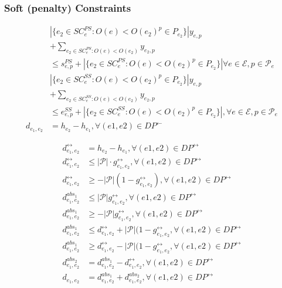 \documentclass{article}
\newcommand{\scriptP}{\mathcal{P}}
\newcommand{\scriptE}{\mathcal{E}}
\begin{document}
\subsubsection{Soft (penalty) Constraints}

\begin{align}
    &|\{e_2 \in SC_e^{PS}: O(e) < O(e_2) ^ p \in P_{e_2}\}| y_{e,p} \nonumber \\
    &+ \sum_{e_2 \in SC^{PS}_e : O(e) < O(e_2)} y_{e_2, p} \nonumber\\
    &\le s^{PS}_{e,p} + |\{e_2 \in SC_e^{PS}: O(e) < O(e_2) ^ p \in P_{e_2}\}| \forall e \in \scriptE, p \in \scriptP_e \\
    &|\{e_2 \in SC_e^{SS}: O(e) < O(e_2) ^ p \in P_{e_2}\}| y_{e,p} \nonumber\\ 
    &+ \sum_{e_2\in SC_e^{SS}:O(e)<O(e_2)} y_{e_2, p} \nonumber\\
    &\le e^{SS}_{e,p} + |\{e_2 \in SC_e^{SS}: O(e) < O(e_2) ^ p \in P_{e_2}\}|, \forall e \in \scriptE, p \in \scriptP_e \\
    d_{e_1, e_2} &= h_{e_2} - h_{e_1}, \forall (e1, e2) \in DP^{\leftarrow}
\end{align}

\begin{align}
    d^{\leftrightarrow}_{e_1, e_2} &= h_{e_2} - h_{e_1}  , \forall (e1, e2) \in DP^{\leftrightarrow} \\
    d^{\leftrightarrow}_{e_1, e_2} &\le |\scriptP|\cdot g^{\leftrightarrow}_{e_1, e_2}  , \forall (e1, e2) \in DP^{\leftrightarrow} \\
    d^{\leftrightarrow}_{e_1, e_2} &\ge - |\scriptP| (1 - g^{\leftrightarrow}_{e_1, e_2})   , \forall (e1, e2) \in DP^{\leftrightarrow} \\
    d^{abs_1}_{e_1, e_2} &\le |\scriptP|g^{\leftrightarrow}_{e_1, e_2}  , \forall (e1, e2) \in DP^{\leftrightarrow} \\
    d^{abs_1}_{e_1, e_2} &\ge - |\scriptP|g^{\leftrightarrow}_{e_1, e_2}  , \forall (e1, e2) \in DP^{\leftrightarrow} \\
    d^{abs_1}_{e_1, e_2} &\le d^{\leftrightarrow}_{e_1, e_2} + |\scriptP| (1 - g^{\leftrightarrow}_{e_1, e_2}  , \forall (e1, e2) \in DP^{\leftrightarrow} \\
    d^{abs_1}_{e_1, e_2} &\ge d^{\leftrightarrow}_{e_1, e_2} - |\scriptP| (1 - g^{\leftrightarrow}_{e_1, e_2}  , \forall (e1, e2) \in DP^{\leftrightarrow} \\
    d^{abs_2}_{e_1, e_2} &= d^{abs_1}_{e_1, e_2} - d^{\leftrightarrow}_{e_1, e_2}  , \forall (e1, e2) \in DP^{\leftrightarrow} \\
    d_{e_1, e_2} &= d^{abs_1}_{e_1, e_2} + d^{abs_2}_{e_1, e_2} , \forall (e1, e2) \in DP^{\leftrightarrow} 
\end{align}
\end{document}
